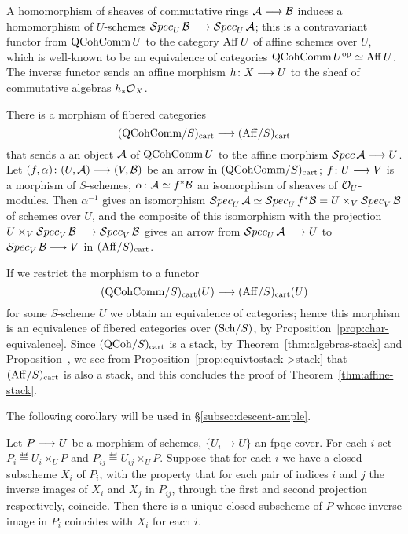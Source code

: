 \begin{4   STACKS}
\begin{4.3 Descent for morphisms of schemes}
A homomorphism of sheaves of commutative rings $\cA \arr \cB$ induces a homomorphism of $U$-schemes $\cursspec_U \cB \arr \cursspec_U \cA$; this is a contravariant functor from $\operatorname{QCohComm} U$ to the category $\operatorname{Aff} U$ of affine schemes over $U$, which is well-known to be an equivalence of categories $\operatorname{QCohComm}{U}^{\mathrm{op}} \simeq \operatorname{Aff}{U}$. The inverse functor sends an affine morphism $h \colon X \arr U$ to the \qc sheaf of commutative algebras $h_* \mathcal{O}_X$.

There is a morphism of fibered categories
   \[
   \catqcalg{S}\cart \arr \cataff{S}\cart
   \]
that sends a an object $\mathcal{A}$ of $\operatorname{QCohComm} U$ to the affine morphism $\cursspec \cA \arr U$. Let $(f, \alpha) \colon (U, \cA) \arr (V, \cB)$ be an arrow in $({\mathrm{QCohComm}/S})_\mathrm{cart}$; $f \colon U \arr V$ is a morphism of $S$-schemes, $\alpha \colon \mathcal{A} \simeq f^{*}\mathcal{B}$ an isomorphism of sheaves of $\mathcal{O}_{U}$-modules. Then $\alpha^{-1}$ gives an isomorphism $\mathop{\mathcal{S}pec}_U \mathcal{A} \simeq \mathop{\mathcal{S}pec}_U f^* \mathcal{B} = U \times_V \mathop{\mathcal{S}pec}_V \mathcal{B}$ of schemes over $U$, and the composite of this isomorphism with the projection $U \times_V \cursspec_V \cB \arr \cursspec_V \cB$ gives an arrow from $\cursspec_U \cA \arr U$ to $\cursspec_V \cB \arr V$ in $({\mathrm{Aff}/S})_\mathrm{cart}$.

If we restrict the morphism to a functor
   \[
   \catqcalg{S}\cart (U) \arr \cataff{S}\cart(U)
   \]
for some $S$-scheme $U$ we obtain an equivalence of categories; hence this morphism is an equivalence of fibered categories over $({\mathrm{Sch}/S})$, by Proposition~\ref{prop:char-equivalence}. Since $({\mathrm{QCoh}/S})_\mathrm{cart}$ is a stack, by Theorem~\ref{thm:algebras-stack} and Proposition~, we see from Proposition~\ref{prop:equivtostack->stack} that $({\mathrm{Aff}/S})_\mathrm{cart}$ is also a stack, and this concludes the proof of Theorem~\ref{thm:affine-stack}.

The following corollary will be used in \S\ref{subsec:descent-ample}.

\begin{corollary}\label{cor:descent-embeddings}
Let $P \arr U$ be a morphism of schemes, $\{U_{i} \to U\}$ an fpqc cover. For each $i$ set $P_{i} \eqdef U_{i}\times_{U} P$ and $P_{ij} \eqdef U_{ij}\times_{U} P$. Suppose that for each $i$ we have a closed subscheme $X_{i}$ of $P_{i}$, with the property that for each pair of indices $i$ and $j$ the inverse images of $X_{i}$ and $X_{j}$ in $P_{ij}$, through the first and second projection respectively, coincide. Then there is a unique closed subscheme of $P$ whose inverse image in $P_{i}$ coincides with $X_{i}$ for each $i$.
\end{corollary}


\end{4.3 Descent for morphisms of schemes}
\end{4   STACKS}
